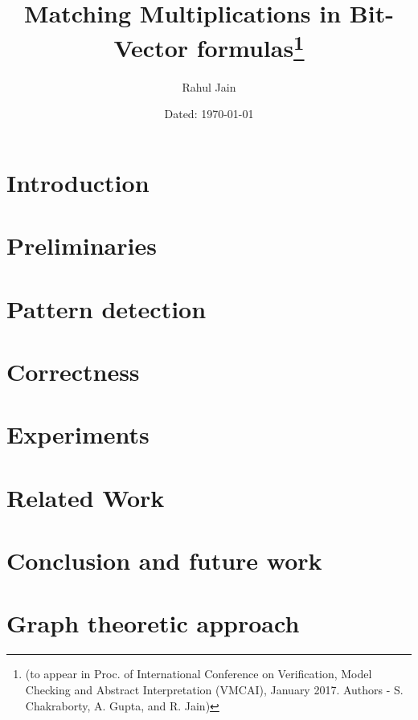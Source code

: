 \documentclass{report}
\begin{document}
\title{Matching Multiplications in Bit-Vector formulas\footnote{(to appear in Proc. of International Conference on Verification, Model Checking and Abstract Interpretation (VMCAI), January 2017. Authors - S. Chakraborty, A. Gupta, and R. Jain)}}




\author{Rahul Jain}

\date{Dated: \today}

\maketitle

\begin{abstract}

\end{abstract}


\tableofcontents

%
\chapter{Introduction}
\label{sec:intro}


\chapter{Preliminaries}
\label{sec:prelim}


\chapter{Pattern detection}
\label{sec:pattern}


\chapter{Correctness}
\label{sec:correct}


\chapter{Experiments}
\label{sec:experiments}



 \chapter{Related Work}
 \label{sec:related}
 

\chapter{Conclusion and future work}
\label{sec:conclusion}


\chapter{Graph theoretic approach}
\label{sec:exploratory}




\end{document}
